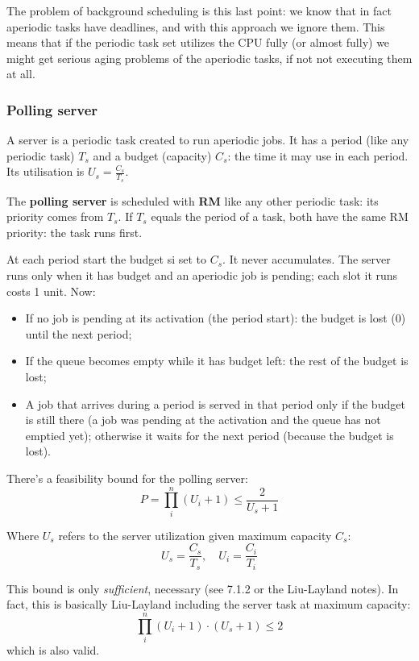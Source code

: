 \documentclass[a4paper,11pt]{article}
\begin{document}
The problem of background scheduling is this last point: we know that in fact aperiodic tasks have deadlines, and with this approach we ignore them. This means that if the periodic task set utilizes the CPU fully (or almost fully) we might get serious aging problems of the aperiodic tasks, if not not executing them at all.

\subsubsection{Polling server}

A server is a periodic task created to run aperiodic jobs. It has a period (like any periodic task) $T_s$ and a budget (capacity) $C_s$: the time it may use in each period. Its utilisation is $U_s = \frac{C_s}{T_s}$.

The \textbf{polling server} is scheduled with \textbf{RM} like any other periodic task: its priority comes from $T_s$. If $T_s$ equals the period of a task, both have the same RM priority: the task runs first.

At each period start the budget si set to $C_s$. It never accumulates.
The server runs only when it has budget and an aperiodic job is pending; each slot it runs costs 1 unit.
Now:
\begin{itemize}
	\item If no job is pending at its activation (the period start): the budget is lost (0) until the next period;
	\item If the queue becomes empty while it has budget left: the rest of the budget is lost;
	\item A job that arrives during a period is served in that period only if the budget is still there (a job was pending at the activation and the queue has not emptied yet); otherwise it waits for the next period (because the budget is lost).
\end{itemize}

\par\smallskip


There's a feasibility bound for the polling server:
$$
	P = \prod_i^n (U_i + 1) \leq \frac{2}{U_s + 1}
$$

Where $U_s$ refers to the server utilization given maximum capacity $C_s$:
$$
	U_s = \frac{C_s}{T_s}, \quad U_i = \frac{C_i}{T_i}
$$

This bound is only \textit{sufficient}, necessary (see 7.1.2 or the Liu-Layland notes).
In fact, this is basically Liu-Layland including the server task at maximum capacity:
$$
	\prod_i^n (U_i + 1) \cdot (U_s + 1) \leq 2
$$
which is also valid.
\end{document}
